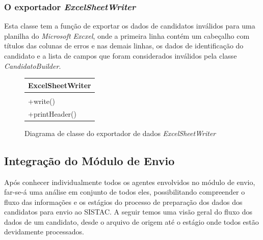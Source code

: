 \documentclass[
	12pt,			%
	openright,		%
	oneside,	
	a4paper,		%
	english,		%
	brazil			%
]{abntex2/abntex2}  %
\begin{document}
	\subsubsection{O exportador \textit{ExcelSheetWriter}}
	
	Esta classe tem a função de exportar os dados de candidatos inválidos para uma planilha do \textit{Microsoft Excxel}, onde a primeira linha contém um cabeçalho com títulos das colunas de erros e nas demais linhas, os dados de identificação do candidato e a lista de campos que foram considerados inválidos pela classe \textit{CandidatoBuilder}.
	
	\begin{figure}[H]
		\begin{center}
			
			\caption{Diagrama de classe do exportador de dados \textit{ExcelSheetWriter}}
			\label{excelwriter-uml}
			
			\begin{tabular}{|l|}
				\hline
				\multicolumn{1}{|c|}{\textbf{ExcelSheetWriter}} \\ \hline
				\\ \hline
				+write()                                      \\
				+printHeader()                          \\ \hline
			\end{tabular}
			
		\end{center}
	\end{figure}
	
	\subsection{Integração do Módulo de Envio}
	
	Após conhecer individualmente todos os agentes envolvidos no módulo de envio, far-se-á uma análise em conjunto de todos eles, possibilitando compreender o fluxo das informações e os estágios do processo de preparação dos dados dos candidatos para envio ao SISTAC. A seguir temos uma visão geral do fluxo dos dados de um candidato, desde o arquivo de origem até o estágio onde todos estão devidamente processados.
	
\end{document}
